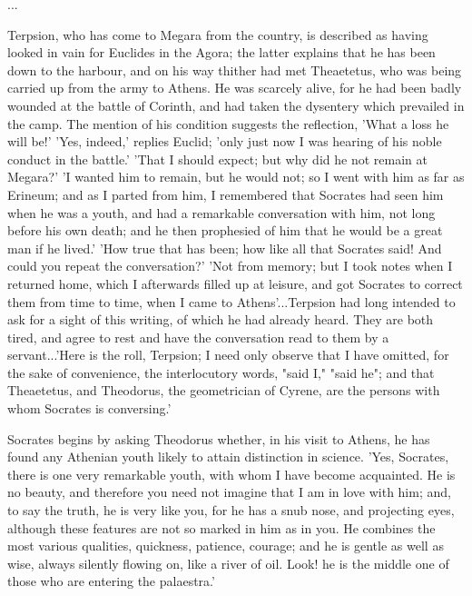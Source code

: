 \documentclass[11pt,letter]{article}
\begin{document}
\par  ...

\par  Terpsion, who has come to Megara from the country, is described as having looked in vain for Euclides in the Agora; the latter explains that he has been down to the harbour, and on his way thither had met Theaetetus, who was being carried up from the army to Athens. He was scarcely alive, for he had been badly wounded at the battle of Corinth, and had taken the dysentery which prevailed in the camp. The mention of his condition suggests the reflection, 'What a loss he will be!' 'Yes, indeed,' replies Euclid; 'only just now I was hearing of his noble conduct in the battle.' 'That I should expect; but why did he not remain at Megara?' 'I wanted him to remain, but he would not; so I went with him as far as Erineum; and as I parted from him, I remembered that Socrates had seen him when he was a youth, and had a remarkable conversation with him, not long before his own death; and he then prophesied of him that he would be a great man if he lived.' 'How true that has been; how like all that Socrates said! And could you repeat the conversation?' 'Not from memory; but I took notes when I returned home, which I afterwards filled up at leisure, and got Socrates to correct them from time to time, when I came to Athens'...Terpsion had long intended to ask for a sight of this writing, of which he had already heard. They are both tired, and agree to rest and have the conversation read to them by a servant...'Here is the roll, Terpsion; I need only observe that I have omitted, for the sake of convenience, the interlocutory words, "said I," "said he"; and that Theaetetus, and Theodorus, the geometrician of Cyrene, are the persons with whom Socrates is conversing.'

\par  Socrates begins by asking Theodorus whether, in his visit to Athens, he has found any Athenian youth likely to attain distinction in science. 'Yes, Socrates, there is one very remarkable youth, with whom I have become acquainted. He is no beauty, and therefore you need not imagine that I am in love with him; and, to say the truth, he is very like you, for he has a snub nose, and projecting eyes, although these features are not so marked in him as in you. He combines the most various qualities, quickness, patience, courage; and he is gentle as well as wise, always silently flowing on, like a river of oil. Look! he is the middle one of those who are entering the palaestra.'
\end{document}

